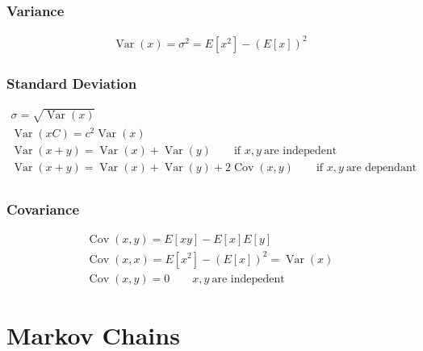 \documentclass{article}
\DeclareMathOperator{\Var}{\textrm{Var}}
\DeclareMathOperator{\Cov}{\textrm{Cov}}
\begin{document}
    \subsubsection{Variance}
    \begin{gather}
        \Var(x) = \sigma^2 = E[x^2] - (E[x])^2
    \end{gather}

    \subsubsection{Standard Deviation}
    \begin{gather}
        \sigma = \sqrt{\Var(x)} \\
        \Var(xC) = c^2\Var(x) \\
        \Var(x+y) = \Var(x) + \Var(y) \qquad \textrm{if } x,y \ \textrm{are indepedent} \\
        \Var(x+y) = \Var(x) + \Var(y) + 2\Cov(x, y) \qquad \textrm{if } x,y \ \textrm{are dependant} \\
    \end{gather}

    \subsubsection{Covariance}
    \begin{gather}
        \Cov(x,y) = E[xy] - E[x]E[y] \\
        \Cov(x,x) = E[x^2] - (E[x])^2 = \Var(x) \\
        \Cov(x,y) = 0 \qquad x,y \ \textrm{are indepedent}
    \end{gather}

    \section{Markov Chains}
\end{document}
